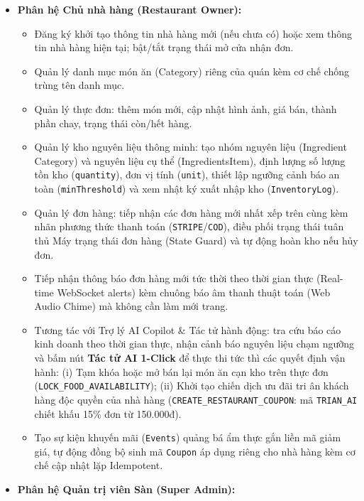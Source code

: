 \documentclass{uetgraduation}
\begin{document}
\begin{itemize}
\begin{itemize}
        \item Gửi, chỉnh sửa, xóa đánh giá số sao (1 đến 5 sao) cho từng nhà hàng hoặc từng món ăn cụ thể trong đơn hàng đã hoàn thành.
    \end{itemize}
    \item \textbf{Phân hệ Chủ nhà hàng (Restaurant Owner):}
    \begin{itemize}
        \item Đăng ký khởi tạo thông tin nhà hàng mới (nếu chưa có) hoặc xem thông tin nhà hàng hiện tại; bật/tắt trạng thái mở cửa nhận đơn.
        \item Quản lý danh mục món ăn (Category) riêng của quán kèm cơ chế chống trùng tên danh mục.
        \item Quản lý thực đơn: thêm món mới, cập nhật hình ảnh, giá bán, thành phần chay, trạng thái còn/hết hàng.
        \item Quản lý kho nguyên liệu thông minh: tạo nhóm nguyên liệu (Ingredient Category) và nguyên liệu cụ thể (IngredientsItem), định lượng số lượng tồn kho (\texttt{quantity}), đơn vị tính (\texttt{unit}), thiết lập ngưỡng cảnh báo an toàn (\texttt{minThreshold}) và xem nhật ký xuất nhập kho (\texttt{InventoryLog}).
        \item Quản lý đơn hàng: tiếp nhận các đơn hàng mới nhất xếp trên cùng kèm nhãn phương thức thanh toán (\texttt{STRIPE}/\texttt{COD}), điều phối trạng thái tuân thủ Máy trạng thái đơn hàng (State Guard) và tự động hoàn kho nếu hủy đơn.
        \item Tiếp nhận thông báo đơn hàng mới tức thời theo thời gian thực (Real-time WebSocket alerts) kèm chuông báo âm thanh thuật toán (Web Audio Chime) mà không cần làm mới trang.
        \item Tương tác với Trợ lý AI Copilot \& Tác tử hành động: tra cứu báo cáo kinh doanh theo thời gian thực, nhận cảnh báo nguyên liệu chạm ngưỡng và bấm nút \textbf{Tác tử AI 1-Click} để thực thi tức thì các quyết định vận hành: (i) Tạm khóa hoặc mở bán lại món ăn cạn kho trên thực đơn (\texttt{LOCK\_FOOD\_AVAILABILITY}); (ii) Khởi tạo chiến dịch ưu đãi tri ân khách hàng độc quyền của nhà hàng (\texttt{CREATE\_RESTAURANT\_COUPON}: mã \texttt{TRIAN\_AI} chiết khấu 15\% đơn từ 150.000đ).
        \item Tạo sự kiện khuyến mãi (\texttt{Events}) quảng bá ẩm thực gắn liền mã giảm giá, tự động đồng bộ sinh mã \texttt{Coupon} áp dụng riêng cho nhà hàng kèm cơ chế cập nhật lặp Idempotent.
    \end{itemize}
    \item \textbf{Phân hệ Quản trị viên Sàn (Super Admin):}

\end{itemize}
\end{document}
